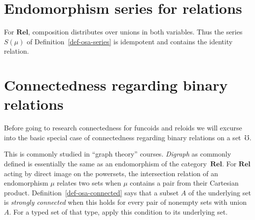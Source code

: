 \section{Endomorphism series for relations}
For $\mathbf{Rel}$, composition distributes over unions in both
variables. Thus the series $S(\mu)$ of Definition~\ref{def-osa-series}
is idempotent and contains the identity relation.

\section{Connectedness regarding binary relations}

Before going to research connectedness for funcoids and reloids we
will excurse into the basic special case of connectedness regarding
binary relations on a set~$\mho$.

This is commonly studied in ``graph theory'' courses. \emph{Digraph}
as commonly defined is essentially the same as an endomorphism of
the category~$\mathbf{Rel}$.
For $\mathbf{Rel}$ acting by direct image on the powersets, the
intersection relation of an endomorphism $\mu$ relates two sets when
$\mu$ contains a pair from their Cartesian product. Definition~\ref{def-osa-connected}
says that a subset $A$ of the underlying set is \emph{strongly
connected} when this holds for every pair of nonempty sets with union
$A$. For a typed set of that type, apply this condition to its underlying set.

